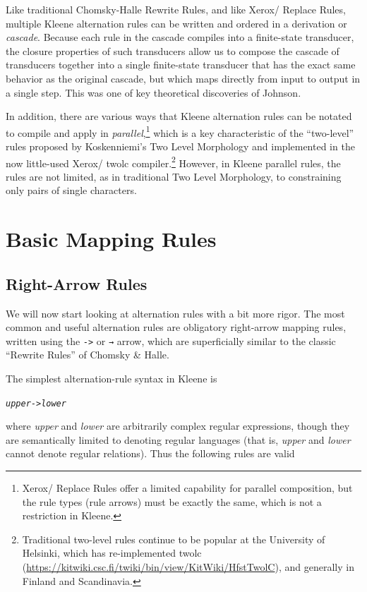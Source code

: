Like traditional Chomsky-Halle Rewrite Rules, and like Xerox/ Replace Rules,
multiple Kleene alternation rules can be written and ordered in a derivation or
\emph{cascade}.  Because each rule in the cascade compiles into a finite-state transducer,
the closure properties of such transducers allow us to compose the cascade of transducers
together into a single finite-state transducer that has the exact same behavior as the
original cascade, but which maps directly from input to output in a single step.  This
was one of key theoretical discoveries of Johnson.

In addition, there are various ways that Kleene alternation rules can be notated to compile
and apply in \emph{parallel},\footnote{Xerox/ Replace Rules offer a limited
capability for parallel composition, but the rule types (rule arrows) must be exactly the
same, which is not a restriction in Kleene.}  which is a key characteristic of the
``two-level'' rules proposed by Koskenniemi's Two Level Morphology and implemented in the
now little-used Xerox/ twolc compiler.\footnote{Traditional two-level rules
	continue to be popular at the University of Helsinki, which has re-implemented twolc
(\url{https://kitwiki.csc.fi/twiki/bin/view/KitWiki/HfstTwolC}), and generally in Finland
and Scandinavia.}  However, in Kleene parallel rules, the rules are not limited, as in
traditional Two Level Morphology, to constraining only pairs of single characters.

\section{Basic Mapping Rules}

\subsection{Right-Arrow Rules}

We will now start looking at alternation rules with a bit more rigor.  
The most common and useful alternation rules are obligatory right-arrow mapping rules, written using
the \texttt{->} or \texttt{→} arrow, which are
superficially similar to the classic ``Rewrite Rules'' of Chomsky \& Halle.

The simplest alternation-rule syntax in Kleene is

\begin{alltt}
\emph{upper} -> \emph{lower}
\end{alltt}

\noindent
where \emph{upper} and \emph{lower} are
arbitrarily complex regular expressions, though they are semantically limited to
denoting regular languages (that is, \emph{upper} and \emph{lower} cannot denote regular relations).
Thus the following rules are valid


